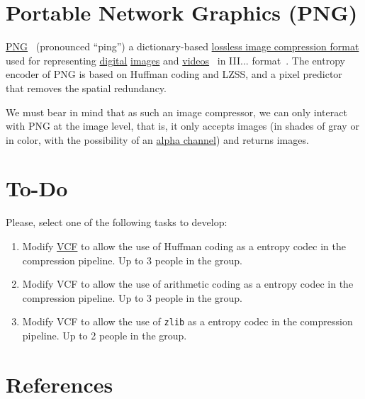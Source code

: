 \section{Portable Network Graphics (PNG)}

\href{https://en.wikipedia.org/wiki/Portable_Network_Graphics}{PNG}~\cite{vruiz__PNG}
(pronounced ``ping'') a dictionary-based
\href{https://en.wikipedia.org/wiki/Lossless_compression}{lossless
  image compression format} used for representing
\href{https://en.wikipedia.org/wiki/Digital_data}{digital}
\href{https://en.wikipedia.org/wiki/Digital_image}{images} and
\href{https://en.wikipedia.org/wiki/Video}{videos}~\cite{vruiz__image_video}
in III... format~\cite{vruiz__video_compression}. The entropy encoder
of PNG is based on Huffman coding and LZSS, and a pixel predictor that
removes the spatial redundancy.

We must bear in mind that as such an image compressor, we can only
interact with PNG at the image level, that is, it only accepts images
(in shades of gray or in color, with the possibility of an
\href{https://en.wikipedia.org/wiki/Alpha_compositing}{alpha channel})
and returns images.



\section{To-Do}
Please, select one of the following tasks to develop:
\begin{enumerate}
\item Modify \href{https://github.com/Sistemas-Multimedia/VCF}{VCF} to
  allow the use of Huffman coding as a entropy codec in the
  compression pipeline. Up to 3 people in the group.
\item Modify VCF to allow the use of arithmetic coding as a entropy
  codec in the compression pipeline. Up to 3 people in the group.
\item Modify VCF to allow the use of \texttt{zlib} as a entropy codec
  in the compression pipeline. Up to 2 people in the group.
\end{enumerate}

\section{References}

\renewcommand{\addcontentsline}[3]{}%

